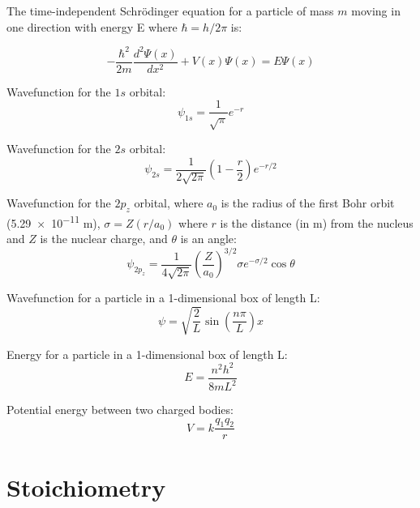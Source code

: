\documentclass[10pt]{article}
\begin{document}
The time-independent Schr\"odinger equation for a particle of mass $m$ moving in one direction with energy E where $\hbar=h/2\pi$ is:

\begin{equation*}
-\frac{\hbar^2}{2m}\frac{d^2\Psi(x)}{dx^2}+V(x)\Psi(x)=E\Psi(x)
\end{equation*}

Wavefunction for the $1s$ orbital:
\begin{equation*}
\psi_{1s} = \frac{1}{\sqrt{\pi}}e^{-r}
\end{equation*}

Wavefunction for the $2s$ orbital:
\begin{equation*}
\psi_{2s} = \frac{1}{2\sqrt{2\pi}}\left(1-\frac{r}{2}\right)e^{-r/2}
\end{equation*}

Wavefunction for the $2p_z$ orbital, where $a_0$ is the radius of the first Bohr orbit (\num{5.29e-11} m), $\sigma = Z(r/a_0)$ 
where $r$ is the distance (in m) from the nucleus and $Z$ is the nuclear charge, and $\theta$ is an angle:
\begin{equation*}
\psi_{2p_z} = \frac{1}{4\sqrt{2\pi}}\left(\frac{Z}{a_0}\right)^{3/2}\sigma e^{-\sigma/2}\cos\theta
\end{equation*}

Wavefunction for a particle in a 1-dimensional box of length L:
\begin{equation*}
\psi=\sqrt{\frac{2}{L}}\sin\left(\frac{n\pi}{L}\right)x
\end{equation*}

Energy for a particle in a 1-dimensional box of length L:
\begin{equation*}
E = \frac{n^2h^2}{8mL^2}
\end{equation*}

Potential energy between two charged bodies:
\begin{equation*}
V=k\frac{q_1q_2}{r}
\end{equation*}



\section{Stoichiometry}
\end{document}
